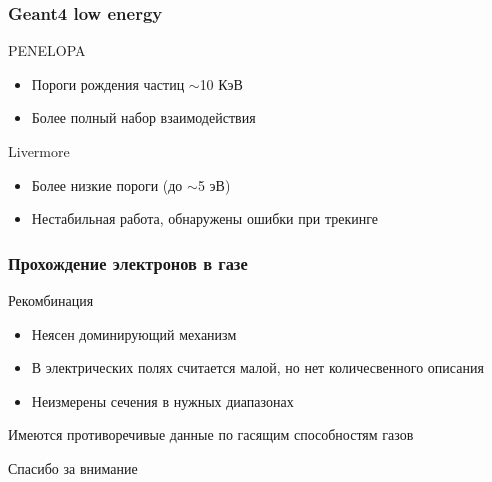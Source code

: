 \documentclass[10pt,pdf,hyperref={unicode}]{beamer}
\begin{document}
\begin{frame}
\frametitle{Geant4 low energy}
\begin{block}{PENELOPA}
\begin{itemize}
\item Пороги рождения частиц $\sim$10 КэВ
\item Более полный набор взаимодействия
\end{itemize}
\end{block}
\begin{block}{Livermore}
\begin{itemize}
\item Более низкие пороги (до $\sim$5 эВ)
\item Нестабильная работа, обнаружены ошибки при трекинге
\end{itemize}
\end{block}
\end{frame}

\begin{frame}
\frametitle{Прохождение электронов в газе}
\begin{block}{Рекомбинация}
\begin{itemize}
\item Неясен доминирующий механизм
\item В электрических полях считается малой, но нет количесвенного описания
\item Неизмерены сечения в нужных диапазонах
\end{itemize}
\end{block}
\Large{Имеются противоречивые данные по гасящим способностям газов}
\end{frame}

\begin{frame}
\begin{center}
\Large{Спасибо за внимание}
\end{center}
\end{frame}
\end{document}
